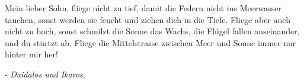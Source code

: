   

\thispagestyle{empty}



\hspace{0pt}
\vfill
    \begin{center}
        Mein lieber Sohn, fliege nicht zu tief, damit die Federn nicht ins Meerwasser tauchen, sonst werden sie feucht und ziehen dich in die Tiefe. Fliege aber auch nicht zu hoch, sonst schmilzt die Sonne das Wachs, die Flügel fallen auseinander, und du stürtzt ab. Fliege die Mittelstrasse zwischen Meer und Sonne immer nur hinter mir her!
        
        \medbreak
        
        - \textit{Daidalos und Ikaros}, \cite{schwab1990}
    \end{center}
\vfill
\hspace{0pt}
